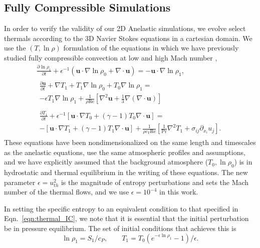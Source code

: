 \documentclass[twocolumn, amsmath, amsfonts, amssymb, trackchanges]{aastex62}
\newcommand{\DivU}{\ensuremath{\nabla\cdot\bm{u}}}
\newcommand{\grad}{\ensuremath{\nabla}}
\begin{document}
\subsection{Fully Compressible Simulations}
In order to verify the validity of our 2D Anelastic simulations, we evolve select thermals according to the 3D Navier Stokes equations in a cartesian domain. 
We use the $(T, \ln\rho)$ formulation of the equations in which we have previously studied fully compressible convection at low and high Mach number \citep{lecoanet&all2014, anders&brown2017},
\begin{gather}
\frac{\partial \ln\rho_1}{\partial t} + \epsilon^{-1}\left(\bm{u}\cdot\grad\ln\rho_0 + \DivU\right) = -\bm{u}\cdot\grad\ln\rho_1, \\
\begin{split}
\frac{\partial \bm{u}}{\partial t}  +\grad T_1 + T_1\grad\ln\rho_0 + T_0\grad\ln\rho_1  =\\
- \epsilon T_1\grad\ln\rho_1 + \frac{1}{\rho\text{Re}}\left[\grad^2\bm{u} + \frac{1}{3}\grad(\DivU)\right]
\end{split} \\
\begin{split}
\frac{\partial T_1}{\partial t} + \epsilon^{-1}\left[\bm{u}\cdot\grad T_0 + (\gamma-1)T_0\DivU\right] = \\
-\left[\bm{u}\cdot\grad T_1 + (\gamma-1)T_1\DivU\right] + \frac{1}{\rho c_V\text{Re}}\left[\frac{1}{\text{Pr}}\grad^2 T_1 + \sigma_{ij}\partial_{x_i}u_j\right].
\end{split}
\end{gather}
These equations have been nondimensionalized on the same length and timescales as the anelastic equations, use the same atmospheric profiles and assumptions, and we have explicitly assumed that the background atmosphere ($T_0, \ln\rho_0$) is in hydrostatic and thermal equilibrium in the writing of these equations. 
The new parameter $\epsilon = u_{th}^2$ is the magnitude of entropy perturbations and sets the Mach number of the thermal flows, and we use $\epsilon = 10^{-4}$ in this work. 

In setting the specific entropy to an equivalent condition to that specified in Eqn.~\ref{eqn:thermal_IC}, we note that it is essential that the initial perturbation be in pressure equilibrium. 
The set of initial conditions that achieves this is
\begin{equation}
\ln\rho_1 = S_1/c_P, \qquad T_1 = T_0(e^{-\epsilon\ln\rho_1} - 1)/\epsilon.
\end{equation}
\end{document}
